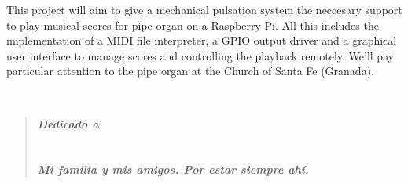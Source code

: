 \begin{singlespace}
\noindent This project will aim to give a mechanical pulsation system the neccesary support to play musical scores for pipe organ on a Raspberry Pi. All this includes the implementation of a MIDI file interpreter, a GPIO output driver and a graphical user interface to manage scores and controlling the playback remotely. We'll pay particular attention to the pipe organ at the Church of Santa Fe (Granada).
\end{singlespace}

\newpage
\thispagestyle{empty}

~

\cleardoublepage
{}
\thispagestyle{empty}

\vspace{6cm}

\begin{quotation}
\noindent \begin{center}
\textbf{\emph{\Large Dedicado a}}\textbf{\emph{\large }}\\
\textbf{\emph{\large }}\\
\textbf{\emph{\large }}\\
\textbf{\emph{\large Mi familia y mis amigos. Por estar siempre ahí.}}
\par\end{center}{\large \par}
\end{quotation}
\newpage
\thispagestyle{empty}

~\newpage
\thispagestyle{empty}


